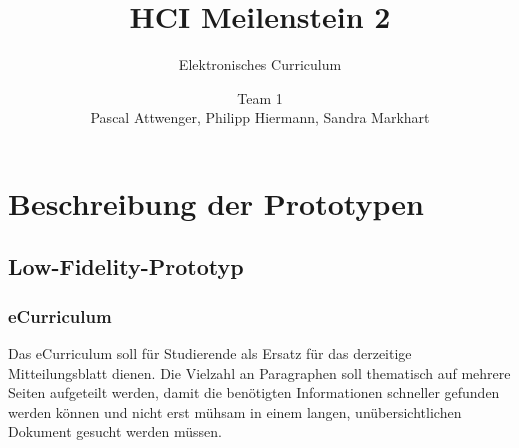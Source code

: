 \documentclass[a4paper,10pt]{scrartcl}
\title{HCI Meilenstein 2}
\subtitle{Elektronisches Curriculum}
\author{Team 1 \\Pascal Attwenger, Philipp Hiermann, Sandra Markhart}
\begin{document}
\maketitle

\section{Beschreibung der Prototypen}

\subsection{Low-Fidelity-Prototyp}

\subsubsection{eCurriculum}

 \noindent{}
 \medskip
 
Das eCurriculum soll für Studierende als Ersatz für das derzeitige Mitteilungsblatt dienen. Die Vielzahl an Paragraphen soll thematisch auf mehrere Seiten aufgeteilt werden, damit die benötigten Informationen schneller gefunden werden können und nicht erst mühsam in einem langen, unübersichtlichen Dokument gesucht werden müssen.
\end{document}
